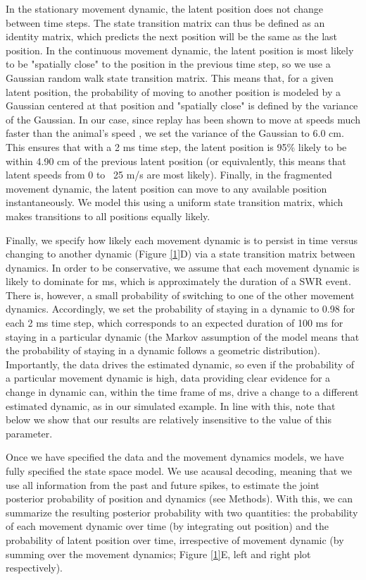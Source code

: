 \documentclass[times, twoside]{zHenriquesLab-StyleBioRxiv}
\begin{document}
In the stationary movement dynamic, the latent position does not change between time steps. The state transition matrix can thus be defined as an identity matrix, which predicts the next position will be the same as the last position. In the continuous movement dynamic, the latent position is most likely to be  "spatially close" to the position in the previous time step, so we use a Gaussian random walk state transition matrix. This means that, for a given latent position, the probability of moving to another position is modeled by a Gaussian centered at that position and "spatially close" is defined by the variance of the Gaussian. In our case, since replay has been shown to move at speeds much faster than the animal's speed \cite{DavidsonHippocampalReplayExtended2009, PfeifferAutoassociativedynamicsgeneration2015}, we set the variance of the Gaussian to 6.0 cm. This ensures that with a 2 ms time step, the latent position is 95\% likely to be within 4.90 cm of the previous latent position (or equivalently, this means that latent speeds from 0 to ~25 m/s are most likely).  Finally, in the fragmented movement dynamic, the latent position can move to any available position instantaneously. We model this using a uniform state transition matrix, which makes transitions to all positions equally likely.

Finally, we specify how likely each movement dynamic is to persist in time versus changing to another dynamic (Figure \ref{1}D) via a state transition matrix between dynamics. In order to be conservative, we assume that each movement dynamic is likely to dominate for  ms, which is approximately the duration of a SWR event. There is, however, a small probability of switching to one of the other movement dynamics. Accordingly, we set the probability of staying in a dynamic to 0.98 for each 2 ms time step, which corresponds to an expected duration of 100 ms for staying in a particular dynamic (the Markov assumption of the model means that the probability of staying in a dynamic follows a geometric distribution). Importantly, the data drives the estimated dynamic, so even if the probability of a particular movement dynamic is high, data providing clear evidence for a change in dynamic can, within the time frame of  ms, drive a change to a different estimated dynamic, as in our simulated example. In line with this, note that below we show that our results are relatively insensitive to the value of this parameter.

Once we have specified the data and the movement dynamics models, we have fully specified the state space model. We use acausal decoding, meaning that we use all information from the past and future spikes, to estimate the joint posterior probability of position and dynamics (see Methods). With this, we can summarize the resulting posterior probability with two quantities: the probability of each movement dynamic over time (by integrating out position) and the probability of latent position over time, irrespective of movement dynamic (by summing over the movement dynamics; Figure \ref{1}E, left and right plot respectively). 
\end{document}
